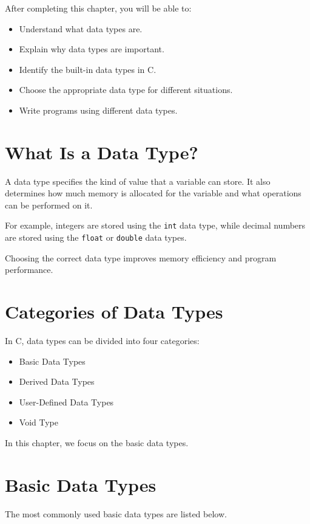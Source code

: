 \documentclass[12pt,openany]{book}
\begin{document}
After completing this chapter, you will be able to:

\begin{itemize}
    \item Understand what data types are.
    \item Explain why data types are important.
    \item Identify the built-in data types in C.
    \item Choose the appropriate data type for different situations.
    \item Write programs using different data types.
\end{itemize}

\section{What Is a Data Type?}

A data type specifies the kind of value that a variable can store. It also determines how much memory is allocated for the variable and what operations can be performed on it.

For example, integers are stored using the \texttt{int} data type, while decimal numbers are stored using the \texttt{float} or \texttt{double} data types.

Choosing the correct data type improves memory efficiency and program performance.

\section{Categories of Data Types}

In C, data types can be divided into four categories:

\begin{itemize}
    \item Basic Data Types
    \item Derived Data Types
    \item User-Defined Data Types
    \item Void Type
\end{itemize}

In this chapter, we focus on the basic data types.

\section{Basic Data Types}

The most commonly used basic data types are listed below.
\end{document}
